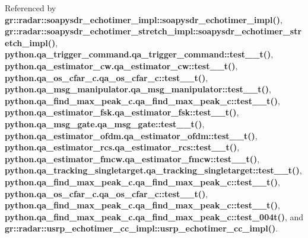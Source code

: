 Referenced by {\bf gr\+::radar\+::soapysdr\+\_\+echotimer\+\_\+impl\+::soapysdr\+\_\+echotimer\+\_\+impl()}, {\bf gr\+::radar\+::soapysdr\+\_\+echotimer\+\_\+stretch\+\_\+impl\+::soapysdr\+\_\+echotimer\+\_\+stretch\+\_\+impl()}, {\bf python.\+qa\+\_\+trigger\+\_\+command.\+qa\+\_\+trigger\+\_\+command\+::test\+\_\+\_\+t()}, {\bf python.\+qa\+\_\+estimator\+\_\+cw.\+qa\+\_\+estimator\+\_\+cw\+::test\+\_\+\_\+t()}, {\bf python.\+qa\+\_\+os\+\_\+cfar\+\_\+c.\+qa\+\_\+os\+\_\+cfar\+\_\+c\+::test\+\_\+\_\+t()}, {\bf python.\+qa\+\_\+msg\+\_\+manipulator.\+qa\+\_\+msg\+\_\+manipulator\+::test\+\_\+\_\+t()}, {\bf python.\+qa\+\_\+find\+\_\+max\+\_\+peak\+\_\+c.\+qa\+\_\+find\+\_\+max\+\_\+peak\+\_\+c\+::test\+\_\+\_\+t()}, {\bf python.\+qa\+\_\+estimator\+\_\+fsk.\+qa\+\_\+estimator\+\_\+fsk\+::test\+\_\+\_\+t()}, {\bf python.\+qa\+\_\+msg\+\_\+gate.\+qa\+\_\+msg\+\_\+gate\+::test\+\_\+\_\+t()}, {\bf python.\+qa\+\_\+estimator\+\_\+ofdm.\+qa\+\_\+estimator\+\_\+ofdm\+::test\+\_\+\_\+t()}, {\bf python.\+qa\+\_\+estimator\+\_\+rcs.\+qa\+\_\+estimator\+\_\+rcs\+::test\+\_\+\_\+t()}, {\bf python.\+qa\+\_\+estimator\+\_\+fmcw.\+qa\+\_\+estimator\+\_\+fmcw\+::test\+\_\+\_\+t()}, {\bf python.\+qa\+\_\+tracking\+\_\+singletarget.\+qa\+\_\+tracking\+\_\+singletarget\+::test\+\_\+\_\+t()}, {\bf python.\+qa\+\_\+find\+\_\+max\+\_\+peak\+\_\+c.\+qa\+\_\+find\+\_\+max\+\_\+peak\+\_\+c\+::test\+\_\+\_\+t()}, {\bf python.\+qa\+\_\+os\+\_\+cfar\+\_\+c.\+qa\+\_\+os\+\_\+cfar\+\_\+c\+::test\+\_\+\_\+t()}, {\bf python.\+qa\+\_\+find\+\_\+max\+\_\+peak\+\_\+c.\+qa\+\_\+find\+\_\+max\+\_\+peak\+\_\+c\+::test\+\_\+\_\+t()}, {\bf python.\+qa\+\_\+find\+\_\+max\+\_\+peak\+\_\+c.\+qa\+\_\+find\+\_\+max\+\_\+peak\+\_\+c\+::test\+\_\+004t()}, and {\bf gr\+::radar\+::usrp\+\_\+echotimer\+\_\+cc\+\_\+impl\+::usrp\+\_\+echotimer\+\_\+cc\+\_\+impl()}.



